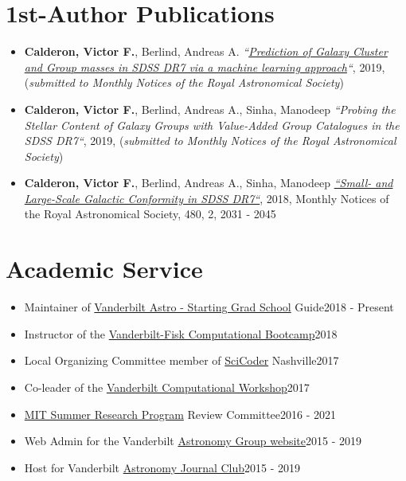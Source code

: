 \documentclass[letterpaper,11pt]{article}
\newcommand{\resumeSubheadingnew}[2]{
  \vspace{-2pt}\item{#1}\hfill{#2}\\[0pt]
  }
\newcommand{\resumeSubHeadingListStart}{\begin{itemize}[leftmargin=*]}
\newcommand{\resumeSubHeadingListEnd}{\end{itemize}}
\newcommand{\MNRAS}{Monthly Notices of the Royal Astronomical Society}
\begin{document}
%
\section{1st-Author Publications}
 \resumeSubHeadingListStart
   \item{
    {\bf Calderon, Victor F.}, Berlind, Andreas A.
    \textit{``\href{https://academic.oup.com/mnras/article/490/2/2367/5581509}{Prediction of Galaxy Cluster and Group masses in SDSS DR7 via a machine learning approach}``}, 2019, (\textit{submitted to \MNRAS})
   }
   \item{
    {\bf Calderon, Victor F.}, Berlind, Andreas A., Sinha, Manodeep
    \textit{``Probing the Stellar Content of Galaxy Groups with Value-Added Group Catalogues in the SDSS DR7``}, 2019, (\textit{submitted to \MNRAS})
   }
   \item{
   \textbf{Calderon, Victor F.}, Berlind, Andreas A., Sinha, Manodeep
   \href{http://dx.doi.org/10.1093/mnras/sty2000}{\it ``Small- and Large-Scale Galactic Conformity in SDSS DR7``}, 2018, \MNRAS, 480, 2, 2031 - 2045
   }
 \resumeSubHeadingListEnd

\section{Academic Service}
  \resumeSubHeadingListStart
    \resumeSubheadingnew
      {Maintainer of \href{https://vanderbilt-astro-starting-grad-school.readthedocs.io/}{Vanderbilt Astro - Starting Grad School} Guide}{2018 - Present}
    \resumeSubheadingnew
      {Instructor of the \href{https://vandyastroml.github.io/2018_Fall_Vandy_Bridge_Computational_Bootcamp.html}{Vanderbilt-Fisk Computational Bootcamp}}{2018}
    \resumeSubheadingnew
      {Local Organizing Committee member of \href{http://scicoder.org/}{SciCoder} Nashville}{2017}
    \resumeSubheadingnew
      {Co-leader of the \href{http://vandyastroml.github.io/2017_Spring_Vandy_Computational_Workshop.html}
      {Vanderbilt Computational Workshop}}{2017}
    \resumeSubheadingnew
      {\href{https://oge.mit.edu/undergraduate/msrp/}{MIT Summer Research Program} Review Committee}{2016 - 2021}
    \resumeSubheadingnew
      {Web Admin for the Vanderbilt \href{https://as.vanderbilt.edu/astronomy/}{Astronomy Group website}}{2015 - 2019}
    \resumeSubheadingnew
      {Host for Vanderbilt \href{https://as.vanderbilt.edu/astronomy/category/journal-club/}{Astronomy Journal Club}}{2015 - 2019}
  \resumeSubHeadingListEnd
\end{document}
